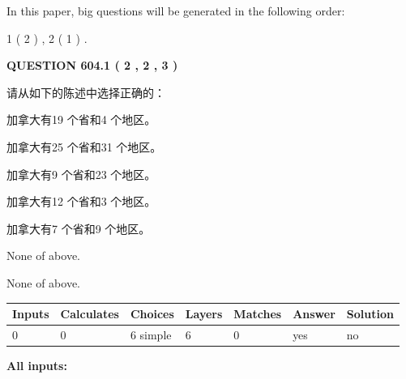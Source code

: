 \documentclass{ctexart}
\begin{document}
   
   
\vspace{0.2in}
   
In this paper, big questions will be generated in the following order: 
   
   
   1 ( 2 )
 ,
   2 ( 1 )
 .
  
\vspace{0.2in}
  
{\textbf{\Large{QUESTION
604.1 
 ( 2 , 2 , 3 )
}}}
  
  
请从如下的陈述中选择正确的：
 
 
加拿大有19 个省和4 个地区。
 
 
加拿大有25 个省和31 个地区。
 
 
加拿大有9 个省和23 个地区。
 
 
加拿大有12 个省和3 个地区。
 
 
加拿大有7 个省和9 个地区。
 
 
 None of above.
 
 
\noindent{}
 
 
 None of above.
 
 
\noindent{}
 
 
   
   
   
   
\noindent\begin{tabular}{|l|l|l|l|l|l|l|}
 \hline
Inputs & Calculates & Choices & Layers & Matches & Answer & Solution \\ \hline
 0  & 
 0  & 
 6
  simple  
  & 
 6  & 
 0  & 
  yes & 
  no 
  \\ \hline
 \end{tabular}
   
   
   
   
\noindent{}
   
   
   
   
\noindent\vspace{0.1in}\hspace{-0.08in} {\textbf{\Large{All inputs: }}}
   
\end{document}

